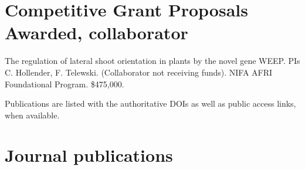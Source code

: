 \documentclass[letterpaper,11pt]{article}
\begin{document}
\section{\sc Competitive Grant Proposals Awarded, collaborator}
The regulation of lateral shoot orientation in plants by the novel gene WEEP. PIs C. Hollender, F. Telewski.  (Collaborator not receiving funds). NIFA AFRI Foundational Program. \$475,000.
\vspace*{0.5in}

Publications are listed with the authoritative DOIs as well as public access links, when available.

\section{Journal publications}
\end{document}
